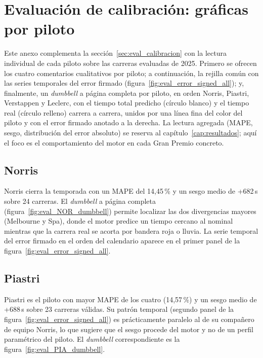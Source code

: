 
\chapter{Evaluación de calibración: gráficas por piloto}
\label{ann:eval_calibracion}

Este anexo complementa la sección~\ref{sec:eval_calibracion} con la lectura individual de cada piloto sobre las carreras evaluadas de 2025. Primero se ofrecen los cuatro comentarios cualitativos por piloto; a continuación, la rejilla común con las series temporales del error firmado (figura~\ref{fig:eval_error_signed_all}); y, finalmente, un \textit{dumbbell} a página completa por piloto, en orden Norris, Piastri, Verstappen y Leclerc, con el tiempo total predicho (círculo blanco) y el tiempo real (círculo relleno) carrera a carrera, unidos por una línea fina del color del piloto y con el error firmado anotado a la derecha. La lectura agregada (MAPE, sesgo, distribución del error absoluto) se reserva al capítulo~\ref{cap:resultados}; aquí el foco es el comportamiento del motor en cada Gran Premio concreto.

\section*{Norris}
\label{ann:eval_NOR}

Norris cierra la temporada con un MAPE del 14{,}45\,\% y un sesgo medio de +682\,s sobre 24 carreras. El \textit{dumbbell} a página completa (figura~\ref{fig:eval_NOR_dumbbell}) permite localizar las dos divergencias mayores (Melbourne y Spa), donde el motor predice un tiempo cercano al nominal mientras que la carrera real se acorta por bandera roja o lluvia. La serie temporal del error firmado en el orden del calendario aparece en el primer panel de la figura~\ref{fig:eval_error_signed_all}.

\section*{Piastri}
\label{ann:eval_PIA}

Piastri es el piloto con mayor MAPE de los cuatro (14{,}57\,\%) y un sesgo medio de +688\,s sobre 23 carreras válidas. Su patrón temporal (segundo panel de la figura~\ref{fig:eval_error_signed_all}) es prácticamente paralelo al de su compañero de equipo Norris, lo que sugiere que el sesgo procede del motor y no de un perfil paramétrico del piloto. El \textit{dumbbell} correspondiente es la figura~\ref{fig:eval_PIA_dumbbell}.


